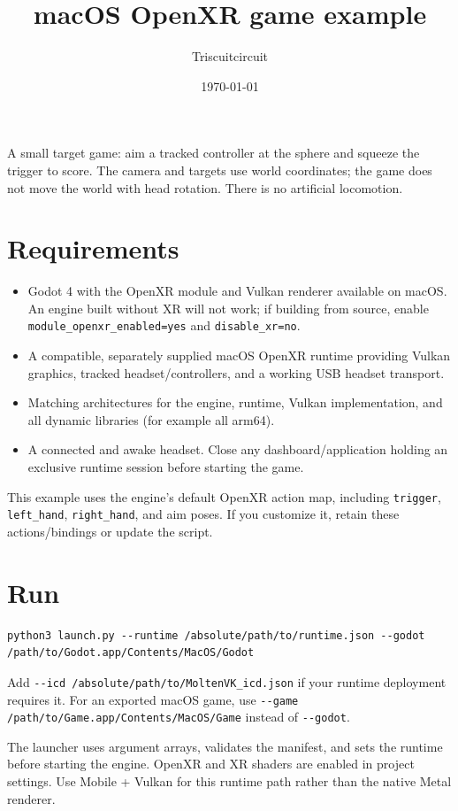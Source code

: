 \documentclass[11pt]{article}
\author{Triscuitcircuit}
\date{\today}
\title{macOS OpenXR game example}
\begin{document}
\maketitle
\tableofcontents

\clearpage

A small target game: aim a tracked controller at the sphere and squeeze the trigger to score. The camera and targets use world coordinates; the game does not move the world with head rotation. There is no artificial locomotion.
\section{Requirements}
\label{sec:org6191da0}
\begin{itemize}
\item Godot 4 with the OpenXR module and Vulkan renderer available on macOS. An engine built without XR will not work; if building from source, enable \texttt{module\_openxr\_enabled=yes} and \texttt{disable\_xr=no}.
\item A compatible, separately supplied macOS OpenXR runtime providing Vulkan graphics, tracked headset/controllers, and a working USB headset transport.
\item Matching architectures for the engine, runtime, Vulkan implementation, and all dynamic libraries (for example all arm64).
\item A connected and awake headset. Close any dashboard/application holding an exclusive runtime session before starting the game.
\end{itemize}

This example uses the engine's default OpenXR action map, including \texttt{trigger}, \texttt{left\_hand}, \texttt{right\_hand}, and aim poses. If you customize it, retain these actions/bindings or update the script.
\section{Run}
\label{sec:org058a7e5}
\begin{verbatim}
python3 launch.py --runtime /absolute/path/to/runtime.json --godot /path/to/Godot.app/Contents/MacOS/Godot
\end{verbatim}
Add \texttt{-{}-{}icd /absolute/path/to/MoltenVK\_icd.json} if your runtime deployment requires it. For an exported macOS game, use \texttt{-{}-{}game /path/to/Game.app/Contents/MacOS/Game} instead of \texttt{-{}-{}godot}.

The launcher uses argument arrays, validates the manifest, and sets the runtime before starting the engine. OpenXR and XR shaders are enabled in project settings. Use Mobile + Vulkan for this runtime path rather than the native Metal renderer.
\end{document}
